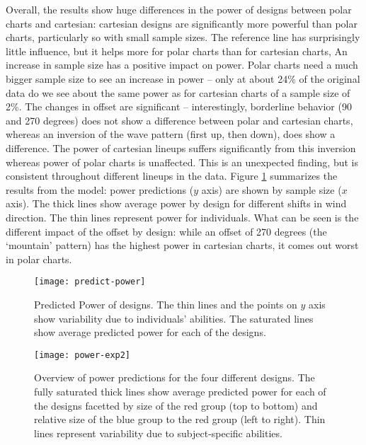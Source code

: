 Overall, the results show huge differences in the power of designs between polar charts and cartesian: cartesian designs are significantly more powerful than polar charts, particularly so with small sample sizes. 
 The reference line has surprisingly little influence, but it helps more for  polar charts than for cartesian charts,
An increase in sample size has a positive impact on power. Polar charts need a much bigger sample size to see an increase in power -- only at about 24\% of the original data do we see about the same power as for cartesian charts of a sample size of 2\%.
The  changes in offset are significant -- interestingly, borderline behavior (90 and 270 degrees) does not show a difference between polar and cartesian charts, whereas an inversion of the wave pattern (first up, then down), does show a difference. The power of cartesian lineups suffers significantly  from this inversion whereas power of polar charts is unaffected. This is an unexpected finding, but is consistent throughout different lineups in the data. Figure \ref{fig:power} summarizes the results from the model: power predictions ($y$ axis) are shown by sample size ($x$ axis). The thick lines show average power by design for different shifts in wind direction. The thin lines represent power for individuals. What can be seen is the different impact of the offset by design: while  an offset of 270 degrees (the `mountain' pattern) has the highest power in cartesian charts, it comes out worst in polar charts.

\begin{figure}[htbp] %
   \centering
   \texttt{[image: predict-power]} 
\vspace{-0.2in}
   \caption{Predicted Power of designs.  The thin lines and the points on $y$ axis show  variability due to individuals' abilities. The saturated lines show average predicted power for each of the designs.}
   \label{fig:power}
\end{figure}

\begin{figure*}[hbtp] %
   \centering
   \texttt{[image: power-exp2]} 
\vspace{-0.2in}
   \caption{Overview of power predictions for the four different designs. The fully saturated thick lines show average predicted power for each of the designs facetted by size of the red group (top to bottom) and relative size of the blue group to the red group (left to right). Thin lines represent variability due to subject-specific abilities. }
   \label{fig:power2}
\end{figure*}

